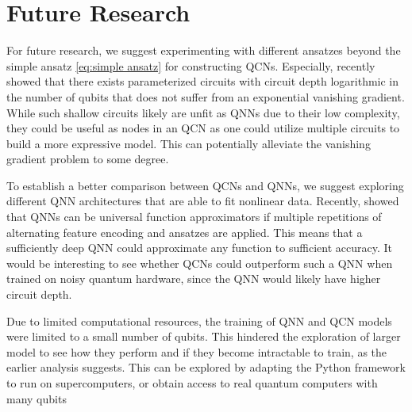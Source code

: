 \section{Future Research}\label{sec:future}
For future research, we suggest experimenting with different ansatzes beyond the simple ansatz \autoref{eq:simple ansatz} for constructing QCNs. Especially, \citet{Cerezo_2021} recently showed that there exists parameterized circuits with circuit depth logarithmic in the number of qubits that does not suffer from an exponential vanishing gradient. While such shallow circuits likely are unfit as QNNs due to their low complexity, they could be useful as nodes in an QCN as one could utilize multiple circuits to build a more expressive model. This can potentially alleviate the vanishing gradient problem to some degree.

To establish a better comparison between QCNs and QNNs, we suggest exploring different QNN architectures that are able to fit nonlinear data. Recently, \citet{Schuld_2021} showed that QNNs can be universal function approximators if multiple repetitions of alternating feature encoding and ansatzes are applied. This means that a sufficiently deep QNN could approximate any function to sufficient accuracy. It would be interesting to see whether QCNs could outperform such a QNN when trained on noisy quantum hardware, since the QNN would likely have higher circuit depth.

Due to limited computational resources, the training of QNN and QCN models were limited to a small number of qubits. This hindered the exploration of larger model to see how they perform and if they become intractable to train, as the earlier analysis suggests. This can be explored by adapting the Python framework to run on supercomputers, or obtain access to real quantum computers with many qubits



